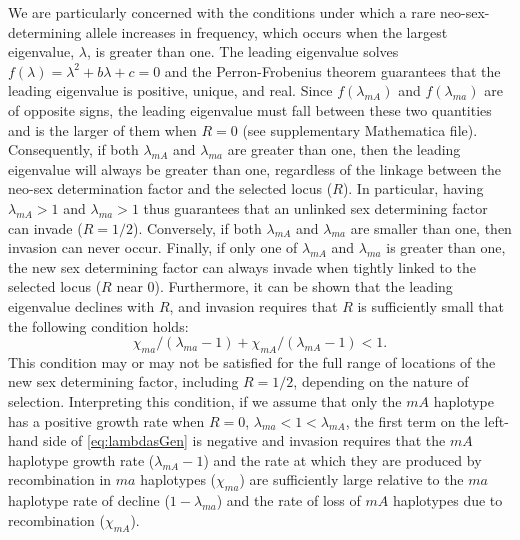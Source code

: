 \documentclass[10pt,letterpaper]{article}
\begin{document}
We are particularly concerned with the conditions under which a rare neo-sex-determining allele increases in frequency, which occurs when the largest eigenvalue, $\lambda$, is greater than one. 
The leading eigenvalue solves $f(\lambda)=\lambda^2+b\lambda+c=0$ and the Perron-Frobenius theorem guarantees that the leading eigenvalue is positive, unique, and real.  
Since $f(\lambda_{mA})$ and $f(\lambda_{ma})$ are of opposite signs, the leading eigenvalue must fall between these two quantities and is the larger of them when $R = 0$ (see supplementary Mathematica file).  
Consequently, if both $\lambda_{mA}$ and $\lambda_{ma}$ are greater than one, then the leading eigenvalue will always be greater than one, regardless of the linkage between the neo-sex determination factor and the selected locus ($R$). 
In particular, having $\lambda_{mA} >1$ and $\lambda_{ma}>1$ thus guarantees that an unlinked sex determining factor can invade ($R=1/2$).  
Conversely, if both $\lambda_{mA}$ and $\lambda_{ma}$ are smaller than one, then invasion can never occur.  
Finally, if only one of  $\lambda_{mA}$ and $\lambda_{ma}$ is greater than one, the new sex determining factor can always invade when tightly linked to the selected locus ($R$ near 0).  
Furthermore, it can be shown that the leading eigenvalue declines with $R$, and invasion requires that $R$ is sufficiently small that the following condition holds: 
\begin{equation}\label{eq:lambdasGen}
\chi_{ma}/\left(\lambda_{ma}-1\right) + \chi_{mA}/\left(\lambda_{mA}-1\right) < 1.
\end{equation}
\noindent 
This condition may or may not be satisfied for the full range of locations of the new sex determining factor, including $R=1/2$, depending on the nature of selection.  
Interpreting this condition, if we assume that only the $mA$ haplotype has a positive growth rate when $R=0$, $\lambda_{ma}<1<\lambda_{mA}$, the first term on the left-hand side of \eqref{eq:lambdasGen} is negative and invasion requires that the $mA$ haplotype growth rate ($\lambda_{mA}-1$) and the rate at which they are produced by recombination in $ma$ haplotypes ($\chi_{ma}$) are sufficiently large relative to the $ma$ haplotype rate of decline ($1-\lambda_{ma}$) and the rate of loss of $mA$ haplotypes due to recombination ($\chi_{mA}$).
\end{document}
